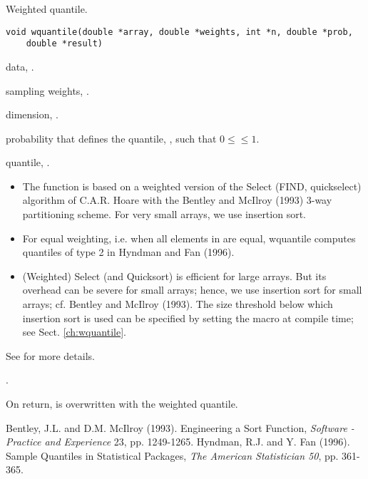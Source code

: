 \documentclass[a4paper,oneside,10pt,DIV=12]{scrartcl}
\def\DATA#1#2#3{
	\item[\code{#1}] #2, \code{double array[#3]}.}
\def\WEIGHTS#1{
	\item[\code{#1}] sampling weights, \code{double array[n]}.
}
\begin{document}
\begin{Description}
Weighted quantile.
\end{Description}
\begin{Usage}
\begin{verbatim}
void wquantile(double *array, double *weights, int *n, double *prob,
    double *result)
\end{verbatim}
\end{Usage}
\begin{Arguments}
	\begin{ldescription}
		\DATA{array}{data}{n}
		\WEIGHTS{weights}
		\item[\code{n}] dimension, .
		\item[\code{prob}] probability that defines the quantile,
			, such that $0 \leq$$\leq 1$.
		\item[\code{result}] quantile, .
	\end{ldescription}
\end{Arguments}
\begin{Details}
	\begin{itemize}
	\item The function is based on a weighted version of the Select (FIND,
		quickselect) algorithm of C.A.R. Hoare with the Bentley and McIlroy
		(1993) 3-way partitioning scheme.
		For very small arrays, we use insertion sort.
	\item For equal weighting, i.e. when all elements in  are
		equal, wquantile computes quantiles of type 2 in Hyndman and Fan
		(1996).
	\item (Weighted) Select (and Quicksort) is efficient for large arrays. But
		its overhead can be severe for small arrays; hence, we use insertion
		sort for small arrays; cf. Bentley and McIlroy (1993). The size
		threshold below which insertion sort is used can be specified by
		setting the macro  at compile time; see Sect.
		\ref{ch:wquantile}.
	\end{itemize}

See  for more details.
\end{Details}
\begin{Dependency}
.
\end{Dependency}
\begin{Value}
On return,  is overwritten with the weighted quantile.
\end{Value}
\begin{References}\relax
Bentley, J.L. and D.M. McIlroy (1993). Engineering a Sort Function,
	\textit{Software - Practice and Experience} 23, pp. 1249-1265.
Hyndman, R.J. and Y. Fan (1996). Sample Quantiles in Statistical Packages,
	\textit{The American Statistician 50}, pp. 361-365.
\end{References}
\end{document}
